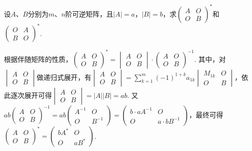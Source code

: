 \begin{exercise}
\begin{exgroup}
        \item 设$A$、$B$分别为$m$、$n$阶可逆矩阵，且$|A|=a$，$|B|=b$，求$\begin{pmatrix}
                A & O \\ O & B
            \end{pmatrix}^*$和$\begin{pmatrix}
                O & A \\ B & O
            \end{pmatrix}^*$.
        \begin{answer}
            根据伴随矩阵的性质，$\begin{pmatrix}
                A & O \\ O & B
            \end{pmatrix}^* = \begin{vmatrix}
                A & O \\ O & B
            \end{vmatrix} \cdot \begin{pmatrix}
                A & O \\ O & B
            \end{pmatrix}^{-1}$. 其中，对$\begin{vmatrix}
                A & O \\ O & B
            \end{vmatrix}$做递归式展开，有$\begin{vmatrix}
                A & O \\ O & B
            \end{vmatrix}=\displaystyle\sum_{k=1}^{m}(-1)^{1+k}a_{1k}\begin{vmatrix}
                M_{1k} & O \\ O & B
            \end{vmatrix}$，依此逐次展开可得$\begin{vmatrix}
                A & O \\ O & B
            \end{vmatrix}=|A||B|=ab$. 又$ab\begin{pmatrix}
                A & O \\ O & B
            \end{pmatrix}^{-1}=ab\begin{pmatrix}
                A^{-1} & O \\ O & B^{-1}
            \end{pmatrix}=\begin{pmatrix}
                b\cdot aA^{-1} & O \\ O & a\cdot bB^{-1}
            \end{pmatrix}$，最终可得$\begin{pmatrix}
                A & O \\ O & B
            \end{pmatrix}^* = \begin{pmatrix}
                bA^* & O \\ O & aB^*
            \end{pmatrix}$.


\end{answer}
\end{exgroup}
\end{exercise}

